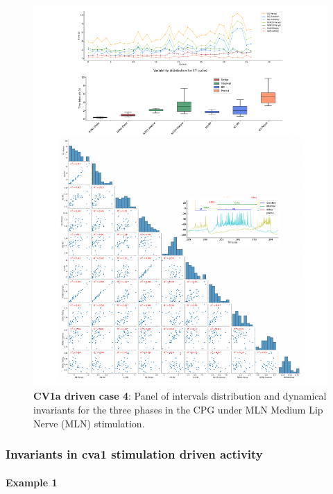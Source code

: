 \begin{figure}[htbp]
	\centering
	\includegraphics[width=1.1\textwidth]{./invariants/data/SUSSEX/MLN_driven/images/panel_with_pairplot.pdf}
	\caption{\textbf{CV1a driven case 4}: Panel of intervals distribution and dynamical invariants for the three phases in the CPG under MLN Medium Lip Nerve (MLN) stimulation.}
	\label{fig:mln stimulation pairplot}
\end{figure}

\subsubsection{Invariants in cva1 stimulation driven activity}

\paragraph{\large{Example 1}}

